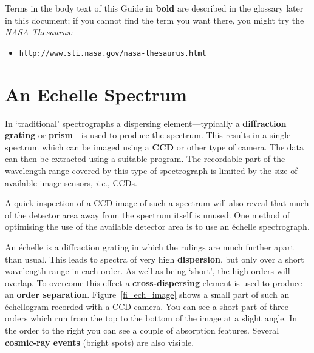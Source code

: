 \documentclass[twoside,11pt]{article}
\newcommand{\stardocinitials}  {SG}
\newcommand{\stardocnumber}    {9.2}
\newcommand{\stardocname}{\stardocinitials /\stardocnumber}
\newcommand{\htmladdnormallink}[2]{#1}
\newcommand{\htmlref}[2]{#1}
\newcommand{\xlabel}[1]{}
\newcommand{\sgspec}[2]{#1}
\newcommand{\sgspec}[2]{#2}
\begin{document}
Terms in the body text of this Guide in {\bf bold} are described in the
\htmlref{glossary}{se_glossary} later in this document;
if you cannot find the term you want there, you might try the
{\sl NASA Thesaurus:}

\begin{itemize}

\item \sgspec{{\tt http://www.sti.nasa.gov/nasa-thesaurus.html}}
      {\htmladdnormallink{\verb+http://www.sti.nasa.gov/nasa-thesaurus.html+}
      {http://www.sti.nasa.gov/nasa-thesaurus.html}}

\end{itemize}


\section{\label{se_example_echelle}\xlabel{example_echelle}An Echelle
         Spectrum}\markboth{An Echelle Spectrum}{\stardocname}

In `traditional' spectrographs a dispersing element\sgspec{---}{ - }typically a
\htmlref{{\bf diffraction grating}}{gl_grating} or
\htmlref{{\bf prism}}{gl_prism}\sgspec{---}{ - }is used to produce the spectrum.
This results in a single spectrum which can be imaged using a
\htmlref{{\bf CCD}}{gl_ccd} or other
type of camera.  The data can then be extracted using a suitable
program.  The recordable part of the wavelength range covered by this type of
spectrograph is limited by the size of available image sensors,
{\em i.e.}, CCDs.

A quick inspection of a CCD image of such a spectrum will also reveal
that much of the detector area away from the spectrum itself is unused.
One method of optimising the use of the available detector area is to
use an \'{e}chelle spectrograph.

An \'{e}chelle is a diffraction grating in which the rulings are much
further apart than usual.
This leads to spectra of very high \htmlref{{\bf dispersion}}{gl_dispersion},
but only over a short wavelength range in each order.
As well as being `short', the high orders will overlap.  To overcome
this effect a \htmlref{{\bf cross-dispersing}}{gl_cross_dispersion}
element is used to produce an
\htmlref{{\bf order separation}}{gl_order_separation}.
\sgspec{Figure~\ref{fi_ech_image}}{The figure below}
shows a small part of such
an \'{e}chellogram recorded with a CCD camera.  You can see a short part
of three orders which run from the top to the bottom of the image at a
slight angle.  In the order to the right you can see a couple of
absorption features.  Several \htmlref{{\bf cosmic-ray events}}{gl_cosmic_ray}
(bright spots) are also visible.
\end{document}
